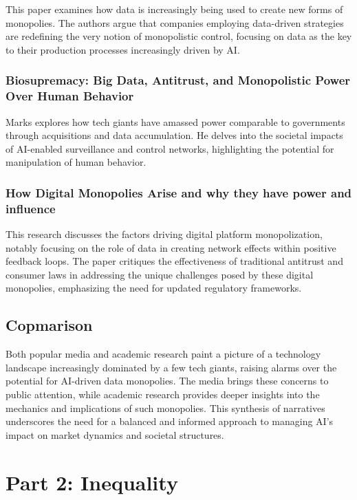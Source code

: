 \documentclass[11pt]{article}
\begin{document}
This paper examines how data is increasingly being used to create new forms of monopolies. The authors argue that companies employing data-driven strategies are redefining the very notion of monopolistic control, focusing on data as the key to their production processes increasingly driven by AI.

\subsubsection{Biosupremacy: Big Data, Antitrust, and Monopolistic Power Over Human Behavior}

Marks explores how tech giants have amassed power comparable to governments through acquisitions and data accumulation. He delves into the societal impacts of AI-enabled surveillance and control networks, highlighting the potential for manipulation of human behavior.

\subsubsection{How Digital Monopolies Arise and why they have power and influence}

This research discusses the factors driving digital platform monopolization, notably focusing on the role of data in creating network effects within positive feedback loops. The paper critiques the effectiveness of traditional antitrust and consumer laws in addressing the unique challenges posed by these digital monopolies, emphasizing the need for updated regulatory frameworks.

\subsection{Copmarison}

Both popular media and academic research paint a picture of a technology landscape increasingly dominated by a few tech giants, raising alarms over the potential for AI-driven data monopolies. The media brings these concerns to public attention, while academic research provides deeper insights into the mechanics and implications of such monopolies. This synthesis of narratives underscores the need for a balanced and informed approach to managing AI's impact on market dynamics and societal structures.

\section{Part 2: Inequality}
\end{document}
